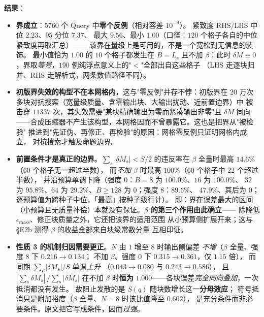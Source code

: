 \textbf{结果}：
\begin{itemize}
  \item \textbf{界成立}：$5760$ 个 Query 中\textbf{零个反例}（相对容差 $10^{-9}$）。
        紧致度 $\mathrm{RHS}/\mathrm{LHS}$ 中位 $2.23$、$95$ 分位 $7.37$、
        最大 $9.56$、最小 $1.00$（口径：$120$ 个格子各自的中位紧致度再取汇总）——
        该界在量级上是可用的，不是一个宽松到无信息的装饰。
        最小值恰为 $1.00$ 的 $10$ 个格子都发生在 $B=L_s$ 且不加 $\beta$：此时
        $\delta M\equiv0$，界取\emph{等号}，$190$ 例纯浮点意义上的"$<$"全部出自这些格子
        （LHS 走逐块归并、RHS 走解析式，两条数值路径不同）。
  \item \textbf{初版界失效的构型不在本网格内}，这与"零反例"并存不悖：初版界在
        $20$ 万次多块对抗搜索（宽量级质量、含零输出块、大输出扰动、近前置边界）中
        被击穿 $11337$ 次，其失效需要"某块精确输出为零而紧凑输出非零"且 $\delta M$
        同向——合成压缩器不产生该构型，本网格因而不曾暴露它。这也是把界从"被检验"
        推进到"先证伪、再修正、再检验"的原因：网格零反例只证明网格内成立，
        对抗搜索才触及命题边界。
  \item \textbf{前置条件才是真正的边界}。$\sum_s|\delta M_s|<S/2$ 的违反率在
        $\beta$ 全量时最高 $14.6\%$（$60$ 个格子无一超过半数），
        而\emph{不加} $\beta$ 时最高 $100\%$（$60$ 个格子中 $22$ 个超过半数），
        并沿预算单调下降（强度 $0$：$B=8$ 为 $100.0\%$、$16$ 为 $100.0\%$、
        $32$ 为 $95.8\%$、$64$ 为 $29.2\%$、$B\ge128$ 为 $0$；强度 $8$：$89.6\%$、
        $47.9\%$、其后为 $0$；逐预算值为跨种子中位，「最高」按种子级行计）。
        即：界在误差最大的区间
        （小预算且无质量补偿）本就没有保证。\textbf{$\beta$ 的第三个作用由此确立}——
        除降低 $\epsilon_{\text{mass}}$、修正块质量之外，它还把该界的适用范围
        从小预算侧扩展开来；这与 §E2b 测得 $\beta$ 的收益全部来自块级常数分量
        互相印证。
  \item \textbf{性质 3 的机制归因需要更正}。$N$ 由 $1$ 增至 $8$ 时输出侧偏差
        \emph{不增}（$\beta$ 全量、强度 $8$ 下 $0.216\to0.134$；
        不加 $\beta$、强度 $0$ 下 $0.315\to0.361$，仅 $1.15$ 倍），
        而同期 $\sum_s|\delta M_s|/S$ 单调\emph{上升}
        （$0.043\to0.080$ 与 $0.243\to0.586$），
        且 $|\sum_s\delta M_s|\,/\sum_s|\delta M_s|$ 在不加 $\beta$ 时\textbf{恒为}
        $1.000$——各块误差\emph{完全同向叠加}，一次抵消都没有发生。
        故阻止发散的是 $S(q)$ 随块数增长这一\textbf{分母效应}；
        符号抵消只是附加裕度（$\beta$ 全量、$N=8$ 时该比值降至 $0.602$），
        是充分条件而非必要条件。原文把它写成条件，因而\emph{过强}。
\end{itemize}

